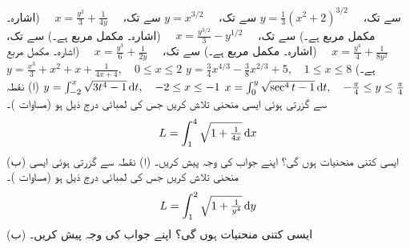  سے  تک،
$y=\tfrac{1}{3}(x^2+2)^{3/2}\quad$
 سے تک،
$y=x^{3/2}\quad$
 سے  تک،
$\quad x=\tfrac{y^3}{3}+\tfrac{1}{4y}\quad$
  (اشارہ۔  مکمل مربع ہے۔)
 سے  تک،
$\quad x=\tfrac{y^{3/2}}{3}-y^{1/2}\quad$
(اشارہ۔  مکمل مربع ہے۔)
 سے  تک،
$\quad x=\tfrac{y^4}{4}+\tfrac{1}{8y^2}\quad$
(اشارہ۔  مکمل مربع ہے۔)
 سے  تک،
$\quad x=\tfrac{y^3}{6}+\tfrac{1}{2y}\quad$
(اشارہ۔  مکمل مربع ہے۔)
$y=\tfrac{3}{4}x^{4/3}-\tfrac{3}{8}x^{2/3}+5,\quad 1\le x\le 8$
$y=\tfrac{x^3}{3}+x^2+x+\tfrac{1}{4x+4},\quad 0\le x\le 2$
$x=\int_0^y\sqrt{\sec^4t-1}\dif t,\quad -\tfrac{\pi}{4}\le y\le \tfrac{\pi}{4}$
$y=\int_{-2}^x\sqrt{3t^4-1}\dif t,\quad -2\le x\le-1$
(ا) نقطہ  سے گزرتی ہوئی ایسی منحنی تلاش کریں جس کی لمبائی درج ذیل ہو (مساوات )۔
\begin{align*}
L=\int_1^4\sqrt{1+\tfrac{1}{4x}}\dif x
\end{align*}
(ب) ایسی کتنی منحنیات ہوں گی؟ اپنے جواب کی وجہ پیش کریں۔ 
(ا) نقطہ   سے گزرتی ہوئی ایسی منحنی تلاش کریں جس کی لمبائی درج ذیل ہو (مساوات )۔
\begin{align*}
L=\int_1^2\sqrt{1+\tfrac{1}{y^4}}\dif y
\end{align*}
 (ب) ایسی کتنی منحنیات ہوں گی؟ اپنے جواب کی وجہ پیش کریں۔ 
